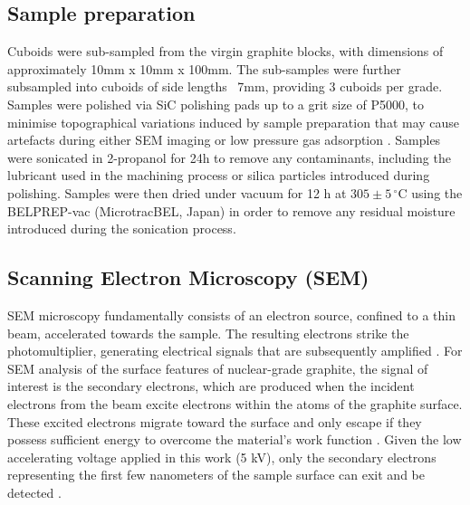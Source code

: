 \documentclass[3p,twocolumn]{elsarticle}
\begin{document}
\subsection{Sample preparation}
Cuboids were sub-sampled from the virgin graphite blocks, with dimensions of
approximately 10mm x 10mm x 100mm. The sub-samples were further subsampled into
cuboids of side lengths ~7mm, providing 3 cuboids per grade. Samples were
polished via SiC polishing pads up to a grit size of P5000, to minimise
topographical variations induced by sample preparation that may cause artefacts
during either SEM imaging or low pressure gas adsorption \citep{Fang2022,Jones2018}.
Samples were sonicated in 2-propanol for 24h to remove any contaminants,
including the lubricant used in the machining process or silica particles
introduced during polishing. Samples were then dried under vacuum for 12 h at
$305 \pm 5\,^\circ\mathrm{C}$ using the BELPREP-vac (MicrotracBEL, Japan) in
order to remove any residual moisture introduced during the sonication process.


\subsection{Scanning Electron Microscopy (SEM)}

SEM microscopy fundamentally consists of an electron source, confined to a thin
beam, accelerated towards the sample. The resulting electrons strike the
photomultiplier, generating electrical signals that are subsequently amplified
\cite{Achaw12, Goldstein2003}. For SEM analysis of the surface features of
nuclear-grade graphite, the signal of interest is the secondary electrons, which
are produced when the incident electrons from the beam excite electrons within
the atoms of the graphite surface. These excited electrons migrate toward the
surface and only escape if they possess sufficient energy to overcome the
material's work function \cite{Achaw12, Goldstein2003}. Given the low
accelerating voltage applied in this work (5 kV), only the secondary electrons
representing the first few nanometers of the sample surface can exit and be
detected \cite{Achaw12, Goldstein2003}.
\end{document}
